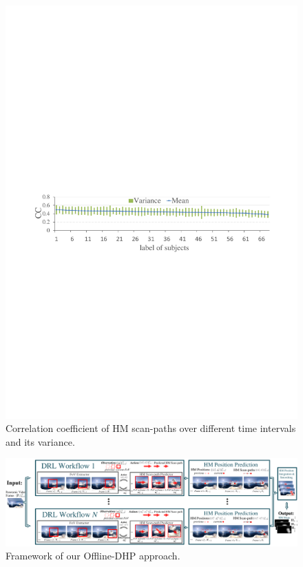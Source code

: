 \documentclass[10pt,journal,compsoc]{IEEEtran}
\begin{document}
\begin{figure}
	\begin{center}
		\centerline{\includegraphics[width=.9\columnwidth]{figures/database/consi_on_time}}%
		\caption{\footnotesize{Correlation coefficient of HM scan-paths over different time intervals and its variance. }}
		\label{consi_on_time}
	\end{center}
\end{figure}

\begin{figure}
	\begin{center}
		\centerline{\includegraphics[width=1.5\columnwidth]{figures/dhp_approach/main_framework}}%
		\caption{Framework of our Offline-DHP approach.}
		\label{main-framework}
	\end{center}
\end{figure}
\end{document}
